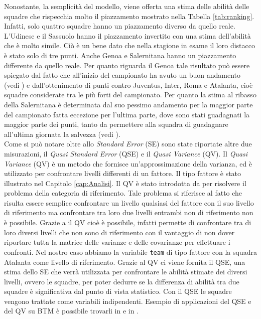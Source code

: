 Nonostante, la semplicità del modello, viene offerta una stima delle abilità delle squadre che rispecchia molto il piazzamento mostrato nella Tabella \ref{tab:ranking}. Infatti, solo quattro squadre hanno un piazzamento diverso da quello reale. L'Udinese e il Sassuolo hanno il piazzamento invertito con una stima dell'abilità che è molto simile. Ciò è un bene dato che nella stagione in esame il loro distacco è stato solo di tre punti. Anche Genoa e Salernitana hanno un piazzamento differente da quello reale. Per quanto riguarda il Genoa tale risultato può essere spiegato dal fatto che all'inizio del campionato ha avuto un buon andamento (vedi \textit{\cite{storyGenoa}}) e dall'ottenimento di punti contro Juventus, Inter, Roma e Atalanta, cioè squadre considerate tra le più forti del campionato. Per quanto la stima al ribasso della Salernitana è determinata dal suo pessimo andamento per la maggior parte del campionato fatta eccezione per l'ultima parte, dove sono stati guadagnati la maggior parte dei punti, tanto da permettere alla squadra di guadagnare all'ultima giornata la salvezza (vedi \textit{\cite{storySal}}). \\
Come si può notare oltre allo \emph{Standard Error} (SE) sono state riportate altre due misurazioni, il \emph{Quasi Standard Error} (QSE) \autocite{firth2004quasi} e il \emph{Quasi Variance} (QV)\autocite{firth2004quasi}. Il \emph{Quasi Variance} (QV)\autocite{firth2004quasi} è un metodo che fornisce un'approssimazione della varianza, ed è utilizzato per confrontare livelli differenti di un fattore. Il tipo fattore è stato illustrato nel Capitolo \ref{cap:Analisi}. Il QV è stato introdotta da \textcite{firth2004quasi} per risolvere il problema della categoria di riferimento. Tale problema si riferisce al fatto che risulta essere semplice confrontare un livello qualsiasi del fattore con il suo livello di riferimento ma confrontare tra loro due livelli entrambi non di riferimento non è possibile. Grazie a il QV cioè è possibile, infatti permette di confrontare tra di loro diversi livelli che non sono di riferimento con il vantaggio di non dover riportare tutta la matrice delle varianze e delle covarianze per effettuare i confronti. Nel nostro caso abbiamo la variabile \texttt{team} di tipo fattore con la squadra Atalanta come livello di riferimento. Grazie al QV ci viene fornita il QSE, una stima dello SE che verrà utilizzata per confrontare le abilità stimate dei diversi livelli, ovvero le squadre, per poter dedurre se la differenza di abilità tra due squadre è significativa dal punto di vista statistico. Con il QSE le squadre vengono trattate come variabili indipendenti. Esempio di applicazioni del QSE e del QV su BTM è possibile trovarli in \textcite{firth2004quasi} e in \textcite{turner2012bradley}.\\
